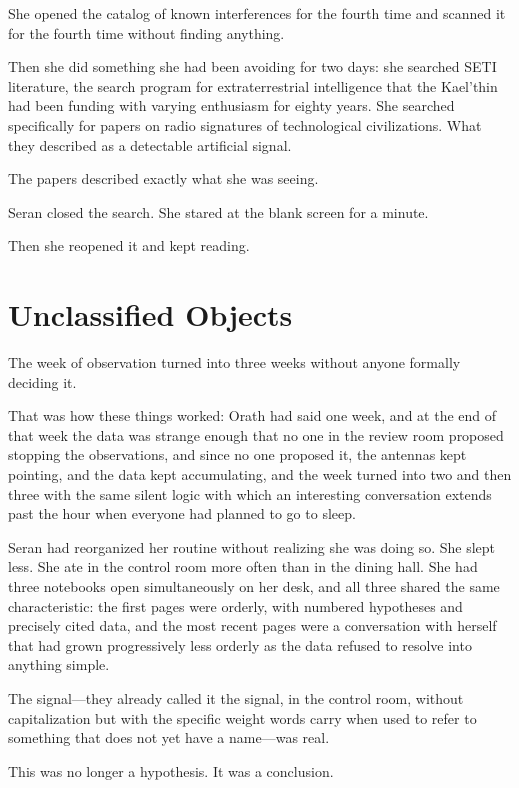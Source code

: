 \documentclass[11pt,a5paper,twoside]{book}
\begin{document}
She opened the catalog of known interferences for the fourth time and scanned it for the fourth time without finding anything.

Then she did something she had been avoiding for two days: she searched SETI literature, the search program for extraterrestrial intelligence that the Kael'thin had been funding with varying enthusiasm for eighty years. She searched specifically for papers on radio signatures of technological civilizations. What they described as a detectable artificial signal.

The papers described exactly what she was seeing.

Seran closed the search. She stared at the blank screen for a minute.

Then she reopened it and kept reading.

\chapter{Unclassified Objects}

The week of observation turned into three weeks without anyone formally deciding it.

That was how these things worked: Orath had said one week, and at the end of that week the data was strange enough that no one in the review room proposed stopping the observations, and since no one proposed it, the antennas kept pointing, and the data kept accumulating, and the week turned into two and then three with the same silent logic with which an interesting conversation extends past the hour when everyone had planned to go to sleep.

Seran had reorganized her routine without realizing she was doing so. She slept less. She ate in the control room more often than in the dining hall. She had three notebooks open simultaneously on her desk, and all three shared the same characteristic: the first pages were orderly, with numbered hypotheses and precisely cited data, and the most recent pages were a conversation with herself that had grown progressively less orderly as the data refused to resolve into anything simple.

The signal—they already called it the signal, in the control room, without capitalization but with the specific weight words carry when used to refer to something that does not yet have a name—was real.

This was no longer a hypothesis. It was a conclusion.
\end{document}
